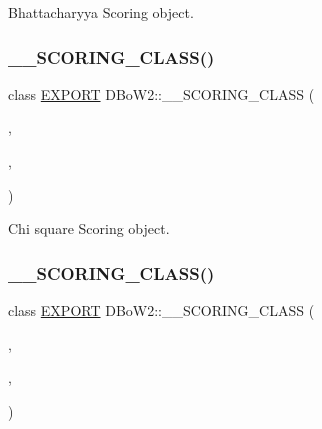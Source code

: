 Bhattacharyya Scoring object. 

\mbox{\label{namespace_d_bo_w2_adc330022cadf004b7ed5b84203287039}} 
\subsubsection{\texorpdfstring{\+\_\+\+\_\+\+S\+C\+O\+R\+I\+N\+G\+\_\+\+C\+L\+A\+S\+S()}{\_\_SCORING\_CLASS()}\hspace{0.1cm}{\footnotesize\ttfamily [5/6]}}
{\footnotesize\ttfamily class \mbox{\hyperlink{config_8h_a3472d8cdbb788d5f1815b3522595bc49}{E\+X\+P\+O\+RT}} D\+Bo\+W2\+::\+\_\+\+\_\+\+S\+C\+O\+R\+I\+N\+G\+\_\+\+C\+L\+A\+SS (\begin{DoxyParamCaption}\item[{Chi\+Square\+Scoring}]{,  }\item[{true}]{,  }\item[{\mbox{\hyperlink{namespace_d_bo_w2_a53e9e0bcfc25c861815e413a7cf3fa51a94f5879ff083c0a8364805ae4f9c2d5c}{L1}}}]{ }\end{DoxyParamCaption})}



Chi square Scoring object. 

\mbox{\label{namespace_d_bo_w2_a9af1c21239089d77c337c65fac3e7bf5}} 
\subsubsection{\texorpdfstring{\+\_\+\+\_\+\+S\+C\+O\+R\+I\+N\+G\+\_\+\+C\+L\+A\+S\+S()}{\_\_SCORING\_CLASS()}\hspace{0.1cm}{\footnotesize\ttfamily [6/6]}}
{\footnotesize\ttfamily class \mbox{\hyperlink{config_8h_a3472d8cdbb788d5f1815b3522595bc49}{E\+X\+P\+O\+RT}} D\+Bo\+W2\+::\+\_\+\+\_\+\+S\+C\+O\+R\+I\+N\+G\+\_\+\+C\+L\+A\+SS (\begin{DoxyParamCaption}\item[{K\+L\+Scoring}]{,  }\item[{true}]{,  }\item[{\mbox{\hyperlink{namespace_d_bo_w2_a53e9e0bcfc25c861815e413a7cf3fa51a94f5879ff083c0a8364805ae4f9c2d5c}{L1}}}]{ }\end{DoxyParamCaption})}



